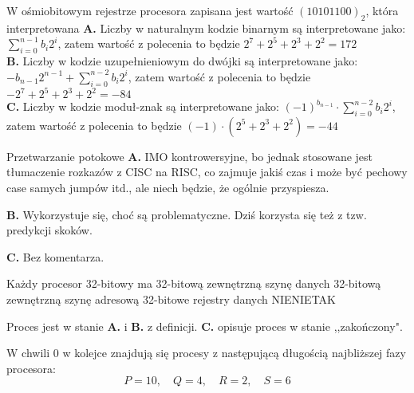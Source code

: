 \begin{solutions}
    \sol W ośmiobitowym rejestrze procesora zapisana jest wartość $(10101100)_2$, która interpretowana
    \textbf{A.} Liczby w naturalnym kodzie binarnym są interpretowane jako: $\sum_{i = 0}^{n - 1} b_i 2^i$, zatem wartość z polecenia to będzie $2^7+2^5+2^3+2^2=172$ \\
    \textbf{B.} Liczby w kodzie uzupełnieniowym do dwójki są interpretowane jako: $-b_{n-1} 2^{n - 1} + \sum_{i = 0}^{n - 2} b_i 2^i$, zatem wartość z polecenia to będzie $-2^7+2^5+2^3+2^2=-84$ \\
    \textbf{C.} Liczby w kodzie moduł-znak są interpretowane jako: $(-1)^{b_{n-1}} \cdot \sum_{i = 0}^{n - 2} b_i 2^i$, zatem wartość z polecenia to będzie $(-1) \cdot (2^5+2^3+2^2) = -44$

    \sol Przetwarzanie potokowe
    \textbf{A.} IMO kontrowersyjne, bo jednak stosowane jest tłumaczenie rozkazów z CISC na RISC, co zajmuje jakiś czas i może być pechowy case samych jumpów itd., ale niech będzie, że ogólnie przyspiesza.
    
    \textbf{B.} Wykorzystuje się, choć są problematyczne. Dziś korzysta się też z tzw. predykcji skoków.
    
    \textbf{C.} Bez komentarza.

    \sol Każdy procesor 32-bitowy ma
    \answerss
    {32-bitową zewnętrzną szynę danych}
    {32-bitową zewnętrzną szynę adresową}
    {32-bitowe rejestry danych}
    {NIE}{NIE}{TAK}
    
    \sol Proces jest w stanie
    \textbf{A.} i \textbf{B.} z definicji. \textbf{C.} opisuje proces w stanie ,,zakończony".

    \sol W chwili $0$ w kolejce znajdują się procesy z następującą długością najbliższej fazy procesora: $$P = 10, \quad Q = 4, \quad R = 2, \quad S = 6$$


\end{solutions}
